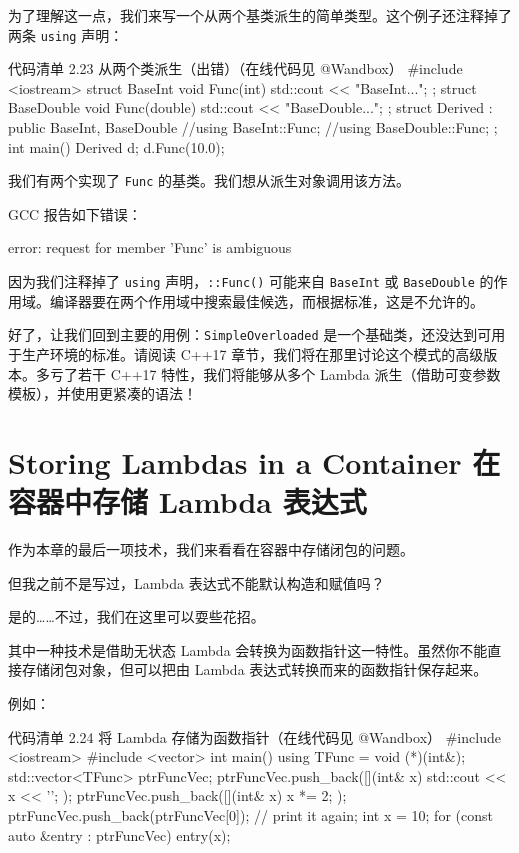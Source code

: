 \begin{codebox}
为了理解这一点，我们来写一个从两个基类派生的简单类型。这个例子还注释掉了两条 \texttt{using} 声明：

\begin{codeboxt}{代码清单 2.23 从两个类派生（出错）（在线代码见 @Wandbox）}
#include <iostream>
struct BaseInt {
void Func(int) { std::cout << "BaseInt...\n"; }
};
struct BaseDouble {
void Func(double) { std::cout << "BaseDouble...\n"; }
};
struct Derived : public BaseInt, BaseDouble {
//using BaseInt::Func;
//using BaseDouble::Func;
};
int main() {
Derived d;
d.Func(10.0);
}
\end{codeboxt}

我们有两个实现了 \texttt{Func} 的基类。我们想从派生对象调用该方法。

GCC 报告如下错误：

\begin{codebox}
error: request for member 'Func' is ambiguous
\end{codebox}

因为我们注释掉了 \texttt{using} 声明，\texttt{::Func()} 可能来自 \texttt{BaseInt} 或 \texttt{BaseDouble} 的作用域。编译器要在两个作用域中搜索最佳候选，而根据标准，这是不允许的。

好了，让我们回到主要的用例：\texttt{SimpleOverloaded} 是一个基础类，还没达到可用于生产环境的标准。请阅读 C++17 章节，我们将在那里讨论这个模式的高级版本。多亏了若干 C++17 特性，我们将能够从多个 Lambda 派生（借助可变参数模板），并使用更紧凑的语法！

\section{Storing Lambdas in a Container 在容器中存储 Lambda 表达式}

作为本章的最后一项技术，我们来看看在容器中存储闭包的问题。

但我之前不是写过，Lambda 表达式不能默认构造和赋值吗？

是的……不过，我们在这里可以耍些花招。

其中一种技术是借助无状态 Lambda 会转换为函数指针这一特性。虽然你不能直接存储闭包对象，但可以把由 Lambda 表达式转换而来的函数指针保存起来。

例如：

\begin{codeboxt}{代码清单 2.24 将 Lambda 存储为函数指针（在线代码见 @Wandbox）}
#include <iostream>
#include <vector>
int main() {
using TFunc = void (*)(int&);
std::vector<TFunc> ptrFuncVec;
ptrFuncVec.push_back([](int& x) { std::cout << x << '\n'; });
ptrFuncVec.push_back([](int& x) { x *= 2; });
ptrFuncVec.push_back(ptrFuncVec[0]); // print it again;
int x = 10;
for (const auto &entry : ptrFuncVec)
entry(x);
}
\end{codeboxt}


\end{codebox}
